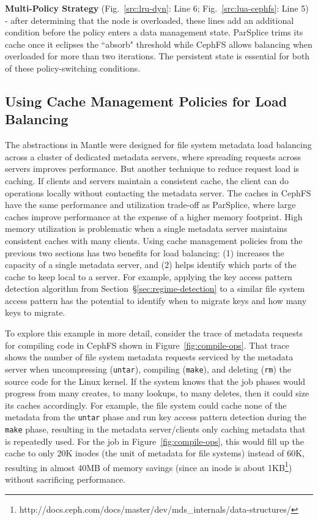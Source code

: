 \textbf{Multi-Policy Strategy} (Fig.~\ref{src:lru-dyn}: Line 6;
Fig.~\ref{src:lua-cephfs}: Line 5) - after determining that the node is
overloaded, these lines add an additional condition before the policy enters a
data management state.  ParSplice trims its cache once it eclipses the
``absorb" threshold while CephFS allows balancing when overloaded for more than
two iterations. The persistent state is essential for both of these
policy-switching conditions.

\subsection{Using Cache Management Policies for Load Balancing}


The abstractions in Mantle were designed for file system metadata load
balancing across a cluster of dedicated metadata servers, where spreading
requests across servers improves performance. But another technique to reduce
request load is caching. If clients and servers maintain a consistent cache,
the client can do operations locally without contacting the metadata server.
The caches in CephFS have the same performance and utilization trade-off as
ParSplice, where large caches improve performance at the expense of a higher
memory footprint. High memory utilization is problematic when a single metadata
server maintains consistent caches with many clients.  Using cache management
policies from the previous two sections has two benefits for load balancing:
(1) increases the capacity of a single metadata server, and (2) helps identify
which parts of the cache to keep local to a server. For example, applying the
key access pattern detection algorithm from
Section~\S\ref{sec:regime-detection} to a similar file system access pattern
has the potential to identify when to migrate keys and how many keys to
migrate.

To explore this example in more detail, consider the trace of metadata requests
for compiling code in CephFS shown in Figure~\ref{fig:compile-ops}.  That trace
shows the number of file system metadata requests serviced by the metadata
server when uncompressing (\texttt{untar}), compiling (\texttt{make}), and
deleting (\texttt{rm}) the source code for the Linux kernel. If the system
knows that the job phases would progress from many creates, to many lookups, to
many deletes, then it could size its caches accordingly. For example, the file
system could cache none of the metadata from the \texttt{untar} phase and run
key access pattern detection during the \texttt{make} phase, resulting in the metadata
server/clients only caching metadata that is repeatedly used. For the job in
Figure~\ref{fig:compile-ops}, this would fill up the cache to only 20K inodes
(the unit of metadata for file systems) instead of 60K, resulting in almost
40MB of memory savings (since an inode is about
1KB\footnote{http://docs.ceph.com/docs/master/dev/mds\_internals/data-structures/})
without sacrificing performance.


